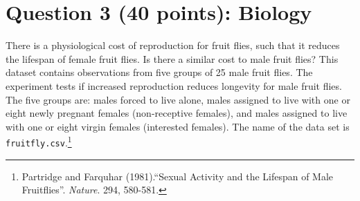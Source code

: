 \documentclass[12pt,letterpaper]{article}
\begin{document}
	\section*{Question 3 (40 points): Biology}

There is a physiological cost of reproduction for fruit flies, such that it reduces the lifespan of female fruit flies.  Is there a similar cost to male fruit flies?  This dataset contains observations from five groups of 25 male fruit flies. The experiment tests if increased reproduction reduces longevity for male fruit flies. The five groups are: males forced to live alone, males assigned to live with one or eight newly pregnant females (non-receptive females), and males assigned to live with one or eight virgin females (interested females). The name of the data set is \texttt{fruitfly.csv}.\footnote{Partridge and Farquhar (1981).``Sexual Activity and the Lifespan of Male Fruitflies''. \textit{Nature}. 294, 580-581.}
	\vspace{1cm}
\end{document}
